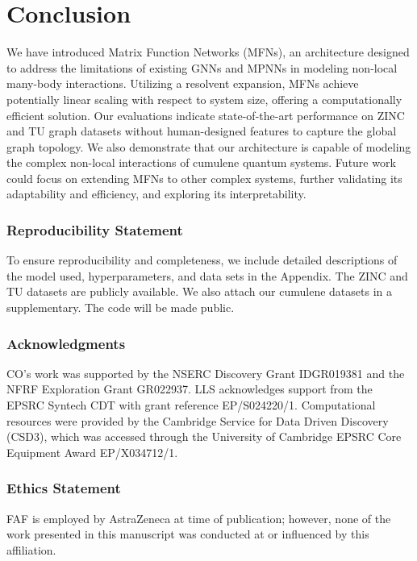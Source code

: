 \documentclass{article} \usepackage{iclr2024_conference,times}
\begin{document}
\section{Conclusion}
\vspace{-8pt}
We have introduced Matrix Function Networks (MFNs), an architecture designed to address the limitations of existing GNNs and MPNNs in modeling non-local many-body interactions. Utilizing a resolvent expansion, MFNs achieve potentially linear scaling with respect to system size, offering a computationally efficient solution. Our evaluations indicate state-of-the-art performance on ZINC and TU graph datasets without human-designed features to capture the global graph topology. We also demonstrate that our architecture is capable of modeling the complex non-local interactions of cumulene quantum systems. Future work could focus on extending MFNs to other complex systems, further validating its adaptability and efficiency, and exploring its interpretability.

\subsubsection*{Reproducibility Statement}
To ensure reproducibility and completeness, we include detailed descriptions of the model used, hyperparameters, and data sets in the Appendix. The ZINC and TU datasets are publicly available. We also attach our cumulene datasets in a supplementary. The code will be made public.





\subsubsection*{Acknowledgments}
CO's work was supported by the NSERC Discovery Grant IDGR019381 and the NFRF Exploration Grant GR022937. 
LLS acknowledges support from the EPSRC Syntech CDT with grant reference EP/S024220/1. 
Computational resources were provided by the Cambridge Service for Data Driven Discovery (CSD3), which was accessed through the University of Cambridge EPSRC Core Equipment Award EP/X034712/1.

\subsubsection*{Ethics Statement}
FAF is employed by AstraZeneca at time of publication; however, none of the work presented in this manuscript was conducted at or influenced by this affiliation.
\end{document}

